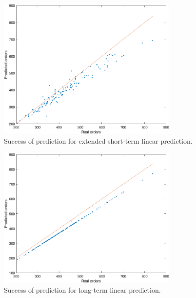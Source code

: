     \newpage
    \begin{figure}[!ht]
        \centering
        \includegraphics[width=0.8\textwidth]{figures/expCompELP.png}
        \caption{Success of prediction for extended short-term linear prediction.}
        \label{fig:eslpmse}
    \end{figure}
    \begin{figure}[!ht]
        \centering
        \includegraphics[width=0.8\textwidth]{figures/expCompELTLP.png}
        \caption{Success of prediction for long-term linear prediction.}
        \label{fig:eltlpmse}
    \end{figure}
